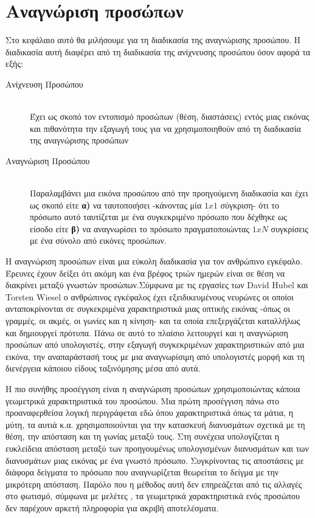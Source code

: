 \chapter{Αναγνώριση προσώπων}\label{ch:facerec}

Στο κεφάλαιο αυτό θα μιλήσουμε για τη διαδικασία της αναγνώρισης προσώπου. Η
διαδικασία αυτή διαφέρει από τη διαδικασία της ανίχνευσης προσώπου όσον αφορά τα
εξής:

\begin{description}
  \item[Ανίχνευση Προσώπου] \hfill \\
    Έχει ως σκοπό τον εντοπισμό προσώπων (θέση, διαστάσεις) εντός μιας εικόνας
    και πιθανότητα την εξαγωγή τους για να χρησιμοποιηθούν από τη διαδικασία της
    αναγνώρισης προσώπων

  \item[Αναγνώριση Προσώπου] \hfill \\
    Παραλαμβάνει μια εικόνα προσώπου από την προηγούμενη διαδικασία και έχει ως
    σκοπό είτε \textbf{α)} να ταυτοποιήσει -κάνοντας μία $1x1$ σύγκριση- ότι το
    πρόσωπο αυτό ταυτίζεται με ένα συγκεκριμένο πρόσωπο που δέχθηκε ως είσοδο
    είτε \textbf{β)} να αναγνωρίσει το πρόσωπο πραγματοποιώντας $1xN$ συγκρίσεις
    με ένα σύνολο από εικόνες προσώπων.

\end{description}

Η αναγνώριση προσώπων είναι μια εύκολη διαδικασία για τον ανθρώπινο εγκέφαλο.
Έρευνες \cite{tuchima2006} έχουν δείξει ότι ακόμη και ένα βρέφος τριών ημερών είναι σε
θέση να διακρίνει μεταξύ γνωστών προσώπων.Σύμφωνα με τις
εργασίες των David Hubel
και Torsten Wiesel  ο ανθρώπινος εγκέφαλος έχει εξειδικευμένους
νευρώνες οι οποίοι ανταποκρίνονται σε συγκεκριμένα χαρακτηριστικά μιας οπτικής
εικόνας -όπως οι γραμμές, οι ακμές, οι γωνίες και η κίνηση- και τα οποία
επεξεργάζεται καταλλήλως και δημιουργεί πρότυπα. Πάνω σε αυτό το πλαίσιο λειτουργεί
και η αναγνώριση προσώπων από υπολογιστές, στην εξαγωγή συγκεκριμένων χαρακτηριστικών
από μια εικόνα, την αναπαράστασή τους με μια αναγνωρίσιμη από υπολογιστές μορφή
και τη διενέργεια κάποιου είδους ταξινόμησης μέσα από αυτά.


Η πιο συνήθης προσέγγιση είναι η αναγνώριση προσώπων χρησιμοποιώντας κάποια
γεωμετρικά χαρακτηριστικά του προσώπου. Μια πρώτη προσέγγιση πάνω στο προαναφερθείσα
λογική περιγράφεται εδώ \cite{Kanade-1973-15078} όπου χαρακτηριστικά όπως τα μάτια, η μύτη, τα
αυτιά κ.α. χρησιμοποιούνται για την κατασκευή διανυσμάτων σχετικά με τη θέση,
την απόσταση και τη γωνίας μεταξύ τους. Στη συνέχεια υπολογίζεται η ευκλείδεια
απόσταση μεταξύ των προηγουμένως υπολογισμένων διανυσμάτων και των διανυσμάτων
μιας εικόνας με ένα γνωστό πρόσωπο. Συγκρίνοντας τις αποστάσεις με διάφορα δείγματα
το πρόσωπο που αναγνωρίζεται θεωρείται το δείγμα με την μικρότερη απόσταση. Παρόλο
που η μέθοδος αυτή δεν επηρεάζεται από τις αλλαγές στο φωτισμό, σύμφωνα με
μελέτες \cite{Brunelli:1992:FRT:645305.648740}, τα γεωμετρικά χαρακτηριστικά ενός προσώπου δεν παρέχουν αρκετή πληροφορία
για ακριβή αποτελέσματα.

